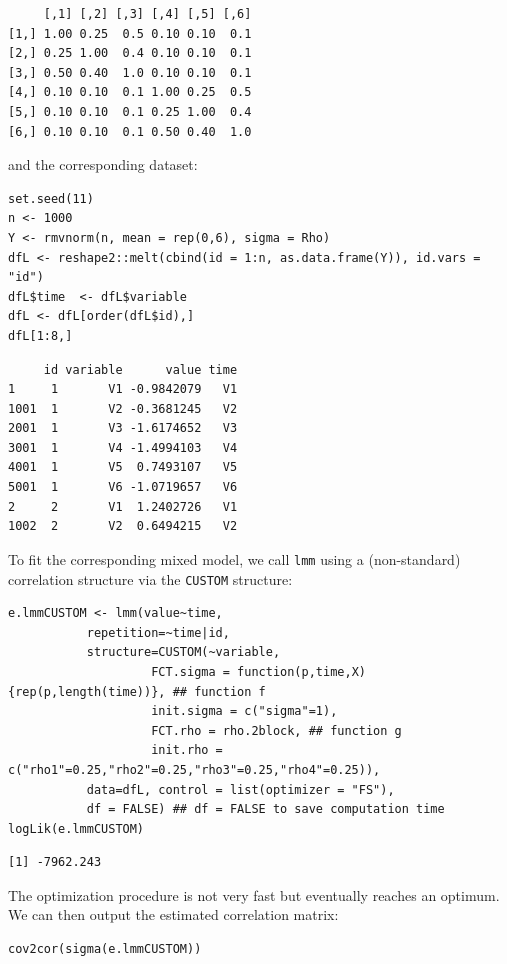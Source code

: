 \documentclass[12pt]{article}
\begin{document}
\begin{verbatim}
     [,1] [,2] [,3] [,4] [,5] [,6]
[1,] 1.00 0.25  0.5 0.10 0.10  0.1
[2,] 0.25 1.00  0.4 0.10 0.10  0.1
[3,] 0.50 0.40  1.0 0.10 0.10  0.1
[4,] 0.10 0.10  0.1 1.00 0.25  0.5
[5,] 0.10 0.10  0.1 0.25 1.00  0.4
[6,] 0.10 0.10  0.1 0.50 0.40  1.0
\end{verbatim}


and the corresponding dataset:
\lstset{language=r,label= ,caption= ,captionpos=b,numbers=none}
\begin{lstlisting}
set.seed(11)
n <- 1000
Y <- rmvnorm(n, mean = rep(0,6), sigma = Rho)
dfL <- reshape2::melt(cbind(id = 1:n, as.data.frame(Y)), id.vars = "id")
dfL$time  <- dfL$variable
dfL <- dfL[order(dfL$id),]
dfL[1:8,]
\end{lstlisting}

\begin{verbatim}
     id variable      value time
1     1       V1 -0.9842079   V1
1001  1       V2 -0.3681245   V2
2001  1       V3 -1.6174652   V3
3001  1       V4 -1.4994103   V4
4001  1       V5  0.7493107   V5
5001  1       V6 -1.0719657   V6
2     2       V1  1.2402726   V1
1002  2       V2  0.6494215   V2
\end{verbatim}


To fit the corresponding mixed model, we call \texttt{lmm} using a
(non-standard) correlation structure via the \texttt{CUSTOM} structure:
\lstset{language=r,label= ,caption= ,captionpos=b,numbers=none}
\begin{lstlisting}
e.lmmCUSTOM <- lmm(value~time,
		   repetition=~time|id,
		   structure=CUSTOM(~variable,
				    FCT.sigma = function(p,time,X){rep(p,length(time))}, ## function f
				    init.sigma = c("sigma"=1),
				    FCT.rho = rho.2block, ## function g
				    init.rho = c("rho1"=0.25,"rho2"=0.25,"rho3"=0.25,"rho4"=0.25)),
		   data=dfL, control = list(optimizer = "FS"),
		   df = FALSE) ## df = FALSE to save computation time
logLik(e.lmmCUSTOM)
\end{lstlisting}

\begin{verbatim}
[1] -7962.243
\end{verbatim}


The optimization procedure is not very fast but eventually reaches an
optimum. We can then output the estimated correlation matrix:
\lstset{language=r,label= ,caption= ,captionpos=b,numbers=none}
\begin{lstlisting}
cov2cor(sigma(e.lmmCUSTOM))
\end{lstlisting}
\end{document}
